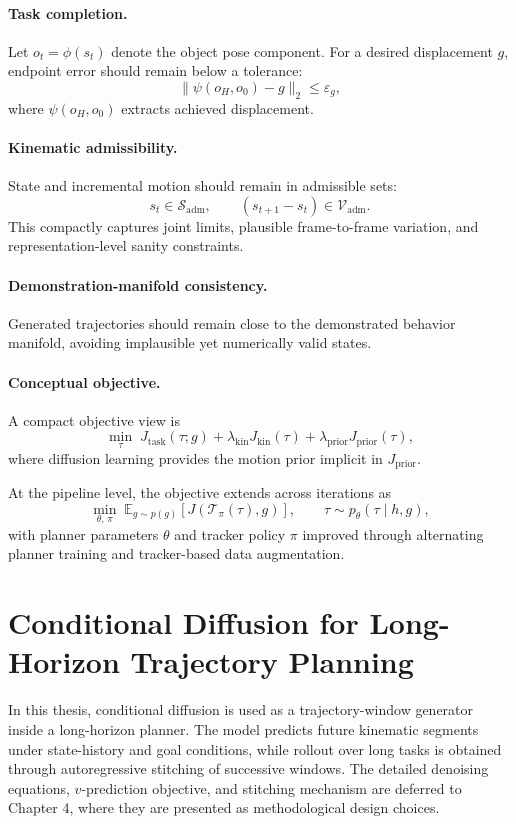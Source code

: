 \paragraph{Task completion.}
Let $o_t=\phi(s_t)$ denote the object pose component. For a desired displacement $g$, endpoint error should remain below a tolerance:
\[
\|\psi(o_H,o_0)-g\|_2 \le \varepsilon_g,
\]
where $\psi(o_H,o_0)$ extracts achieved displacement.

\paragraph{Kinematic admissibility.}
State and incremental motion should remain in admissible sets:
\[
s_t \in \mathcal{S}_{\mathrm{adm}}, \qquad (s_{t+1}-s_t)\in \mathcal{V}_{\mathrm{adm}}.
\]
This compactly captures joint limits, plausible frame-to-frame variation, and representation-level sanity constraints.

\paragraph{Demonstration-manifold consistency.}
Generated trajectories should remain close to the demonstrated behavior manifold, avoiding implausible yet numerically valid states.

\paragraph{Conceptual objective.}
A compact objective view is
\[
\min_{\tau}\; J_{\mathrm{task}}(\tau;g)+\lambda_{\mathrm{kin}}J_{\mathrm{kin}}(\tau)+\lambda_{\mathrm{prior}}J_{\mathrm{prior}}(\tau),
\]
where diffusion learning provides the motion prior implicit in $J_{\mathrm{prior}}$.

At the pipeline level, the objective extends across iterations as
\[
\min_{\theta,\,\pi}\;\mathbb{E}_{g\sim p(g)}\!\left[J\!\left(\mathcal{T}_{\pi}(\tau),g\right)\right],
\qquad \tau\sim p_{\theta}(\tau\mid h,g),
\]
with planner parameters $\theta$ and tracker policy $\pi$ improved through alternating planner training and tracker-based data augmentation.

\section{Conditional Diffusion for Long-Horizon Trajectory Planning}
In this thesis, conditional diffusion is used as a trajectory-window generator inside a long-horizon planner. The model predicts future kinematic segments under state-history and goal conditions, while rollout over long tasks is obtained through autoregressive stitching of successive windows. The detailed denoising equations, $v$-prediction objective, and stitching mechanism are deferred to Chapter 4, where they are presented as methodological design choices.

